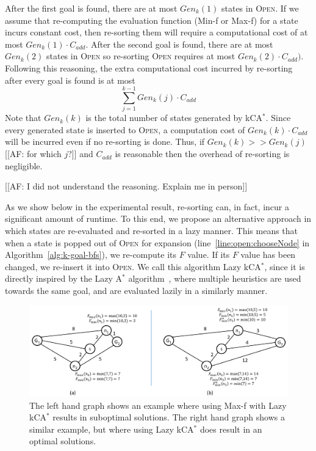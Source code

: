 \documentclass{aicom2e}
\newcommand{\astar}{A$^*$}
\newcommand{\kastar}{kCA$^*$}
\newcommand{\minf}{Min-f}
\newcommand{\maxf}{Max-f}
\newcommand{\open}{\textsc{Open}}
\begin{document}
After the first goal is found, there are at most $Gen_k(1)$ states in \open{}.
If we assume that re-computing the evaluation function (\minf{} or \maxf{}) for
a state incurs constant cost, then re-sorting them will require a computational
cost of at most $Gen_k(1)\cdot C_{add}$. After the second goal is found, there
are at most $Gen_k(2)$ states in \open{} so re-sorting \open{} requires at most
$Gen_k(2)\cdot C_{add})$. Following this reasoning, the extra computational
cost incurred by re-sorting after every goal is found is at most
\begin{equation}
\sum_{j=1}^{k-1} Gen_k(j)\cdot C_{add} \label{eq:re-sort-cost}
\end{equation}
Note that $Gen_k(k)$ is the total number of states generated by \kastar{}.
Since every generated state is inserted to \open{}, a computation cost of
$Gen_k(k)\cdot C_{add}$ will be incurred even if no re-sorting is done. Thus,
if $Gen_k(k)>>Gen_k(j)$ [[AF: for which $j$?]] and $C_{add}$ is reasonable then
the overhead of re-sorting is negligible.

[[AF: I did not understand the reasoning. Explain me in person]]


As we show below in the experimental result, re-sorting can, in fact, incur a
significant amount of runtime. To this end, we propose an alternative approach
in which states are re-evaluated and re-sorted in a lazy manner. This means
that when a state is popped out of \open{} for expansion
(line~\ref{line:open:chooseNode} in Algorithm~\ref{alg:k-goal-bfs}), we
re-compute its $F$ value. If its $F$ value has been changed, we re-insert it
into \open{}. We call this algorithm Lazy \kastar{}, since it is directly
inspired by the Lazy \astar{}
algorithm~\cite{betzalel2015typeSystem,tolpin2013toward}, where multiple
heuristics are used towards the same goal, and are evaluated lazily in a
similarly manner.


\begin{figure}
    \includegraphics[width=\textwidth]{Lazy_cropped.pdf}
    \caption{The left hand graph shows an example where using \maxf{} with Lazy \kastar{} results in suboptimal solutions. The right hand graph shows a similar example, but where using Lazy \kastar{} does result in an optimal solutions.}
    \label{fig:lazy}
\end{figure}
\end{document}
